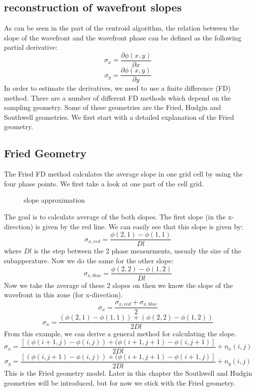 \documentclass{article}
\begin{document}
\subsection{reconstruction of wavefront slopes}
As can be seen in the part of the centroid algorithm, the relation between the slope of the wavefront and the wavefront phase can be defined as the following partial derivative:
$$ \sigma_x = \frac{\partial\phi(x,y)}{\partial x}$$ 
$$ \sigma_y = \frac{\partial\phi(x,y)}{\partial y}$$ 
In order to estimate the derivatives, we need to use a finite difference (FD) method. There are a number of different FD methods which depend on the sampling geometry. Some of these geometries are the Fried, Hudgin and Southwell geometries. We first start with a detailed explanation of the Fried geometry.

\subsection{Fried Geometry}
The Fried FD method calculates the average slope in one grid cell by using the four phase points. We first take a look at one part of the cell grid.
\begin{figure}[h!]
  \centering
  \caption{slope approximation}
\end{figure}
\newpage
\noindent The goal is to calculate average of the both slopes. The first slope (in the x-direction) is given by the red line. We can easily see that this slope is given by:
$$ \sigma_{x,red} = \frac{\phi(2,1) - \phi(1,1)}{Dl} $$
where $Dl$ is the step between the 2 phase measurments, ussualy the size of the subapperature.
Now we do the same for the other slope:
$$ \sigma_{x,blue} = \frac{\phi(2,2) - \phi(1,2)}{Dl} $$
Now we take the average of these 2 slopes on then we know the slope of the wavefront in this zone (for x-direction).
$$ \sigma_x = \frac{\sigma_{x,red}+\sigma_{x,blue}}{2}$$
$$ \sigma_x = \frac{(\phi(2,1) - \phi(1,1))+(\phi(2,2) - \phi(1,2))}{2Dl}$$
From this example, we can derive a general method for calculating the slope. 
$$ \sigma_x = \frac{[(\phi(i+1,j)-\phi(i,j))+(\phi(i+1,j+1)-\phi(i,j+1)]}{2Dl} + n_x(i,j)$$
$$ \sigma_y = \frac{[(\phi(i,j+1)-\phi(i,j))+(\phi(i+1,j+1)-\phi(i+1,j)]}{2Dl} + n_y(i,j)$$
This is the Fried geometry model. Later in this chapter the Southwell and Hudgin geometries will be introduced, but for now we stick with the Fried geometry.  
\end{document}

